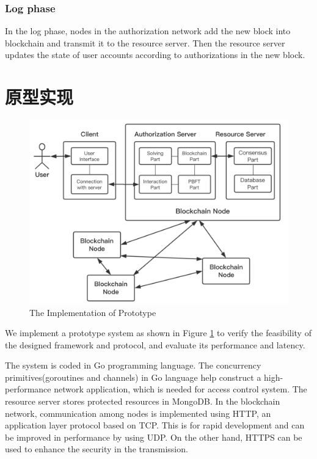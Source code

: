 \subsubsection{Log phase}

In the log phase, nodes in the authorization network add the new block into blockchain and transmit it to the resource server. Then the resource server updates the state of user accounts according to authorizations in the new block.

\section{原型实现}

\begin{figure}
\centering
\includegraphics[width=12cm, keepaspectratio]{figures/implementation.png}
\caption{The Implementation of Prototype}
\label{fig:implementation}
\end{figure}

We implement a prototype system as shown in Figure \ref{fig:implementation} to verify the feasibility of the designed framework and protocol, and evaluate its performance and latency.

The system is coded in Go programming language. The concurrency primitives(goroutines and channels) in Go language help construct a high-performance network application, which is needed for access control system. The resource server stores protected resources in MongoDB. In the blockchain network, communication among nodes is implemented using HTTP, an application layer protocol based on TCP. This is for rapid development and can be improved in performance by using UDP. On the other hand, HTTPS can be used to enhance the security in the transmission. 

